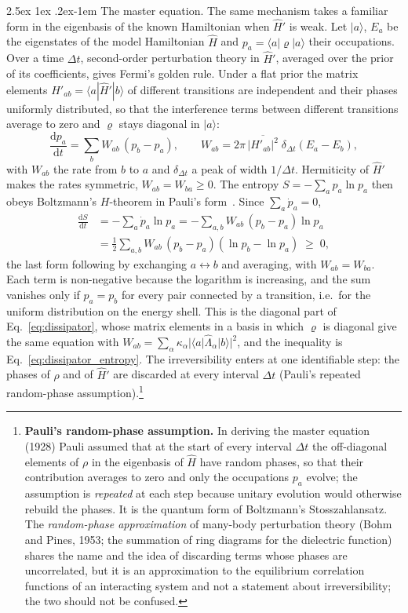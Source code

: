 \documentclass[10pt,a4paper]{article}
\makeatletter
\renewcommand{\paragraph}{\@startsection{paragraph}{4}{\z@}%
  {2.5ex \@plus 1ex \@minus .2ex}{-1em}%
  {\normalfont\fontsize{14pt}{17pt}\selectfont\bfseries}}
\newcommand{\dd}{\mathrm{d}}
\makeatother
\begin{document}
\paragraph{The master equation.}
The same mechanism takes a familiar form in the eigenbasis of the known Hamiltonian when $ \hat H' $ is weak.
Let $ |a\rangle $, $ E_a $ be the eigenstates of the model Hamiltonian $ \hat H $ and $ p_a = \langle a|\varrho|a\rangle $ their occupations.
Over a time $ \Delta t $, second-order perturbation theory in $ \hat H' $, averaged over the prior of its coefficients, gives Fermi's golden rule.
Under a flat prior the matrix elements $ H'_{ab} = \langle a|\hat H'|b\rangle $ of different transitions are independent and their phases uniformly distributed, so that the interference terms between different transitions average to zero and $ \varrho $ stays diagonal in $ |a\rangle $:
\[
  \frac{\dd p_a}{\dd t} = \sum_b W_{ab}\,(p_b - p_a) , \qquad
  W_{ab} = 2\pi\,\overline{|H'_{ab}|^{2}}\;\delta_{\Delta t}(E_a - E_b) ,
\]
with $ W_{ab} $ the rate from $ b $ to $ a $ and $ \delta_{\Delta t} $ a peak of width $ 1/\Delta t $.
Hermiticity of $ \hat H' $ makes the rates symmetric, $ W_{ab} = W_{ba} \geq 0 $.
The entropy $ S = -\sum_ap_a\ln p_a $ then obeys Boltzmann's $ H $-theorem in Pauli's form~\cite{Pauli1928}.
Since $ \sum_a\dot p_a = 0 $,
\[
  \begin{aligned}
  \frac{\dd S}{\dd t} &= -\sum_a\dot p_a\ln p_a
  = -\sum_{a,b}W_{ab}\,(p_b - p_a)\ln p_a \\
  &= \frac{1}{2}\sum_{a,b}W_{ab}\,(p_b - p_a)(\ln p_b - \ln p_a) \;\geq\; 0 ,
  \end{aligned}
\]
the last form following by exchanging $ a \leftrightarrow b $ and averaging, with $ W_{ab} = W_{ba} $.
Each term is non-negative because the logarithm is increasing, and the sum vanishes only if $ p_a = p_b $ for every pair connected by a transition, i.e.\ for the uniform distribution on the energy shell.
This is the diagonal part of Eq.~\eqref{eq:dissipator}, whose matrix elements in a basis in which $ \varrho $ is diagonal give the same equation with $ W_{ab} = \sum_\alpha\kappa_\alpha|\langle a|\hat\Lambda_\alpha|b\rangle|^{2} $, and the inequality is Eq.~\eqref{eq:dissipator_entropy}.
The irreversibility enters at one identifiable step: the phases of $ \rho $ and of $ \hat H' $ are discarded at every interval $ \Delta t $ (Pauli's repeated random-phase assumption).\footnote{\label{fn:pauli}\textbf{Pauli's random-phase assumption.}
In deriving the master equation (1928) Pauli assumed that at the start of every interval $ \Delta t $ the off-diagonal elements of $ \rho $ in the eigenbasis of $ \hat H $ have random phases, so that their contribution averages to zero and only the occupations $ p_a $ evolve; the assumption is \emph{repeated} at each step because unitary evolution would otherwise rebuild the phases.
It is the quantum form of Boltzmann's Stosszahlansatz.
The \emph{random-phase approximation} of many-body perturbation theory (Bohm and Pines, 1953; the summation of ring diagrams for the dielectric function) shares the name and the idea of discarding terms whose phases are uncorrelated, but it is an approximation to the equilibrium correlation functions of an interacting system and not a statement about irreversibility; the two should not be confused.}
\end{document}
